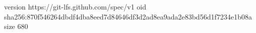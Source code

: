 version https://git-lfs.github.com/spec/v1
oid sha256:870f546264dbdf4dba8eed7d84646df3d2ad8ea9ada2e83bd56d1f7234e1b08a
size 680
